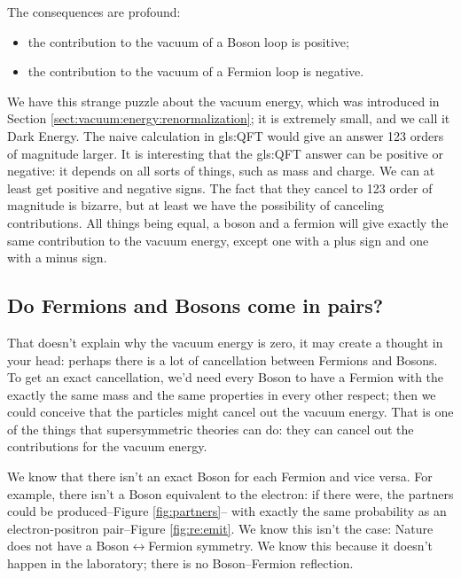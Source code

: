 \documentclass[]{article}
\begin{document}
The consequences are profound:
\begin{itemize}
	\item the contribution to the vacuum of a Boson loop is positive;
	\item the contribution to the vacuum of a Fermion loop is negative.
\end{itemize}
We have this strange puzzle about the vacuum energy, which was introduced in Section \ref{sect:vacuum:energy:renormalization}; it is extremely small, and we call it Dark Energy. The naive calculation in \glsdesc{gls:QFT} would give an answer 123 orders of magnitude larger. It is interesting that the \glsdesc{gls:QFT} answer can be positive or negative: it depends on all sorts of things, such as mass and charge. We can at least get positive and negative signs. The fact that they cancel to 123 order of magnitude is bizarre, but at least we have the possibility of canceling contributions. All things being equal, a boson and a fermion will give exactly the same contribution to the vacuum energy, except one with a plus sign and one with a minus sign.

\subsection{Do Fermions and Bosons come in pairs?}

That doesn't explain why the vacuum energy is zero, it may create a thought in your head: perhaps there is a lot of cancellation between Fermions and Bosons. To get an exact cancellation, we'd need every Boson to have a Fermion with the exactly the same mass and the same properties in every other respect; then we could conceive that the particles might cancel out the vacuum energy. That is one of the things that supersymmetric theories can do: they can cancel out the contributions for the vacuum energy.

We know that there isn't an exact Boson for each Fermion and vice versa. For example, there isn't a Boson equivalent to the electron: if there were, the partners could be produced--Figure \ref{fig:partners}-- with exactly the same probability as an electron-positron pair--Figure \ref{fig:re:emit}. We know this isn't the case: Nature does not have a Boson$\leftrightarrow$Fermion symmetry. We know this because it doesn't happen in the laboratory; there is no Boson--Fermion reflection.  
\end{document}
